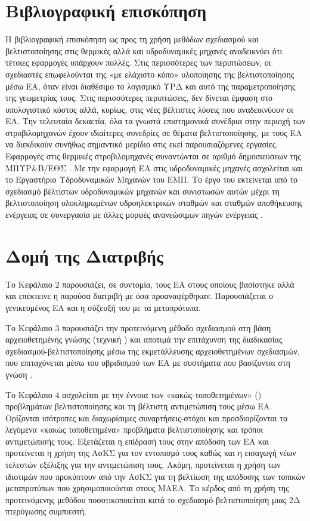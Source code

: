 \section{Βιβλιογραφική επισκόπηση}
Η βιβλιογραφική επισκόπηση ως προς τη χρήση μεθόδων σχεδιασμού και βελτιστοποίησης στις θερμικές αλλά και υδροδυναμικές μηχανές αναδεικνύει ότι τέτοιες εφαρμογές υπάρχουν πολλές. Στις περισσότερες των περιπτώσεων, οι σχεδιαστές επωφελούνται της «με ελάχιστο κόπο» υλοποίησης της βελτιστοποίησης μέσω ΕΑ, όταν είναι διαθέσιμο το λογισμικό ΥΡΔ και αυτό της παραμετροποίησης της γεωμετρίας τους. Στις περισσότερες περιπτώσεις, δεν δίνεται έμφαση στο υπολογιστικό κόστος αλλά, κυρίως, στις νέες βέλτιστες λύσεις που αναδεικνύουν οι ΕΑ. Την τελευταία δεκαετία, όλα τα γνωστά επιστημονικά συνέδρια στην περιοχή των στροβιλομηχανών έχουν ιδιαίτερες συνεδρίες σε θέματα βελτιστοποίησης, με τους ΕΑ να διεκδικούν συνήθως σημαντικό μερίδιο στις εκεί παρουσιαζόμενες εργασίες. Εφαρμογές στις θερμικές στροβιλομηχανές συναντώνται σε αριθμό δημοσιεύσεων της ΜΠΥΡ\&Β/ΕΘΣ \cite{LTT_2_018,LTT_2_020,LTT_2_023,LTT_2_026,LTT_2_031,LTT_2_040, LTT_2_045}.
Με την εφαρμογή ΕΑ στις υδροδυναμικές μηχανές ασχολείται και το Εργαστήριο Υδροδυναμικών Μηχανών του ΕΜΠ. Το έργο του εκτείνεται από το σχεδιασμό βέλτιστων υδροδυναμικών μηχανών και συνιστωσών αυτών \cite{Anagno2,Anagno4} μέχρι τη βελτιστοποίηση ολοκληρωμένων υδροηλεκτρικών σταθμών και σταθμών αποθήκευσης ενέργειας σε συνεργασία με άλλες μορφές ανανεώσιμων πηγών ενέργειας \cite{Anagno3,Anagno5}.             


 
\section{Δομή της Διατριβής} %

Το Κεφάλαιο $2$ παρουσιάζει, σε συντομία, τους ΕΑ στους οποίους βασίστηκε αλλά και επέκτεινε η παρούσα διατριβή με όσα προαναφέρθηκαν. Παρουσιάζεται ο γενικευμένος ΕΑ και η σύζευξή του με τα μεταπρότυπα.

Το Κεφάλαιο $3$ παρουσιάζει την προτεινόμενη μέθοδο σχεδιασμού στη βάση αρχειοθετημένης γνώσης (τεχνική ) και αποτιμά την επιτάχυνση της διαδικασίας σχεδιασμού-βελτιστοποίησης μέσω της εκμετάλλευσης αρχειοθετημένων σχεδιασμών, που επιταχύνεται μέσω του υβριδισμού των ΕΑ με συστήματα που βασίζονται στη γνώση .  


Το Κεφάλαιο $4$ ασχολείται με την έννοια των «κακώς-τοποθετημένων» () προβλημάτων βελτιστοποίησης και τη βέλτιστη αντιμετώπιση τους μέσω ΕΑ. Ορίζονται ισότροπες και διαχωρίσιμες συναρτήσεις-στόχοι και προσδιορίζονται τα λεγόμενα «κακώς τοποθετημένα» προβλήματα βελτιστοποίησης και τρόποι αντιμετώπισής τους.  Εξετάζεται η επίδρασή τους στην απόδοση των ΕΑ και προτείνεται η χρήση της ΑσΚΣ για τον εντοπισμό τους καθώς και η εισαγωγή νέων τελεστών εξέλιξης για την αντιμετώπιση τους.  Ακόμη, προτείνεται η χρήση των ιδιοτιμών που προκύπτουν από την ΑσΚΣ για τη βελτίωση της απόδοσης των τοπικών μεταπροτύπων που χρησιμοποιούνται στους ΜΑΕΑ. Το κέρδος από τη χρήση της προτεινόμενης μεθόδου ποσοτικοποιείται κατά το σχεδιασμό-βελτιστοποίηση μιας 2Δ πτερύγωσης συμπιεστή.  

